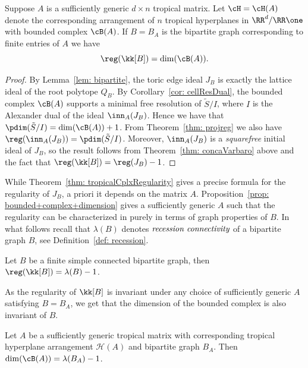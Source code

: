 \begin{theorem}\label{thm: tropicalCplxRegularity}
Suppose $A$ is a sufficiently generic $d \times n$ tropical matrix.  Let $\cH = \cH(A)$ denote the corresponding arrangement of $n$ tropical hyperplanes in $\RR^d/\RR\one$ with bounded complex $\cB(A)$. If $B = B_A$ is the bipartite graph corresponding to finite entries of $A$ we have
\[\reg(\kk[B]) = \dim(\cB(A)).\]
\end{theorem}

\begin{proof}
By Lemma~\ref{lem: bipartite}, the toric edge ideal $J_B$ is exactly the lattice ideal of the root polytope $Q_B$. 
By Corollary~\ref{cor: cellResDual}, the bounded complex $\cB(A)$ supports a minimal free resolution of $\tilde{S}/I$, where $I$ is the Alexander dual of the ideal $\inn_A(J_B)$. Hence we have that $\pdim(\tilde{S}/I) = \dim(\cB(A))+1$. 
From Theorem~\ref{thm: projreg} we also have $\reg(\inn_A(J_B)) = \pdim(\tilde{S}/I)$. 
Moreover, $\inn_A(J_B)$ is a \textit{squarefree} initial ideal of $J_B$, so the result follows from Theorem~\ref{thm: concaVarbaro} above and the fact that $\reg(\kk[B]) = \reg(J_B)-1$.
\end{proof}

While Theorem~\ref{thm: tropicalCplxRegularity} gives a precise formula for the regularity of $J_B$, a priori it depends on the matrix $A$.
Proposition~\ref{prop: bounded+complex+dimension} gives a sufficiently generic $A$ such that the regularity can be characterized in purely in terms of graph properties of $B$.  In what follows recall that $\lambda(B)$ denotes $\emph{recession connectivity}$ of a bipartite graph $B$, see Definition~\ref{def: recession}.


\begin{cor}\label{cor: graph+regularity}
Let $B$ be a finite simple connected bipartite graph, then $\reg(\kk[B]) = \lambda(B)-1$.
\end{cor}

As the regularity of $\kk[B]$ is invariant under any choice of sufficiently generic $A$ satisfying $B = B_A$, we get that the dimension of the bounded complex is also invariant of $B$.

\begin{cor}\label{cor: bounded+complex+equality}
Let $A$ be a sufficiently generic tropical matrix with corresponding tropical hyperplane arrangement ${\mathcal H}(A)$ and bipartite graph $B_A$.
Then $\dim(\cB(A)) = \lambda(B_A) - 1$.
\end{cor}


